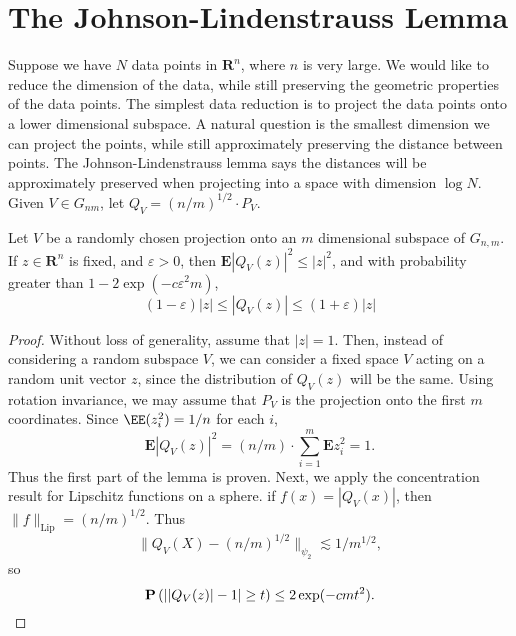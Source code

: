 \section{The Johnson-Lindenstrauss Lemma}

Suppose we have $N$ data points in $\mathbf{R}^n$, where $n$ is very large. We would like to reduce the dimension of the data, while still preserving the geometric properties of the data points. The simplest data reduction is to project the data points onto a lower dimensional subspace. A natural question is the smallest dimension we can project the points, while still approximately preserving the distance between points. The Johnson-Lindenstrauss lemma says the distances will be approximately preserved when projecting into a space with dimension $\log N$. Given $V \in G_{nm}$, let $Q_V = (n/m)^{1/2} \cdot P_V$.

\begin{lemma}
    Let $V$ be a randomly chosen projection onto an $m$ dimensional subspace of $G_{n,m}$. If $z \in \mathbf{R}^n$ is fixed, and $\varepsilon > 0$, then $\mathbf{E} |Q_V(z)|^2 \leq |z|^2$, and with probability greater than $1 - 2\exp(-c\varepsilon^2m)$,
    \[ (1 - \varepsilon) |z| \leq |Q_V(z)| \leq (1 + \varepsilon) |z| \]
\end{lemma}
\begin{proof}
    Without loss of generality, assume that $|z| = 1$. Then, instead of considering a random subspace $V$, we can consider a fixed space $V$ acting on a random unit vector $z$, since the distribution of $Q_V(z)$ will be the same. Using rotation invariance, we may assume that $P_V$ is the projection onto the first $m$ coordinates. Since $\EE(z_i^2) = 1/n$ for each $i$,
    \[ \mathbf{E}|Q_V(z)|^2 = (n/m) \cdot \sum_{i = 1}^m \mathbf{E} z_i^2 = 1. \]
    Thus the first part of the lemma is proven. Next, we apply the concentration result for Lipschitz functions on a sphere. if $f(x) = |Q_V(x)|$, then $\| f \|_{\text{Lip}} = (n/m)^{1/2}$. Thus
    \[ \| Q_V(X) - (n/m)^{1/2} \|_{\psi_2} \lesssim 1/m^{1/2}, \]
    so
    \[ \mathbf{P}\left(\left| |Q_V(z)| - 1 \right| \geq t \right) \leq 2 \exp(-cmt^2). \qedhere \]
\end{proof}

